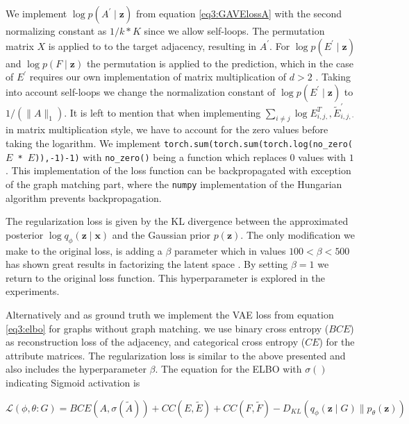 We implement $\log p\left(A^{\prime} \mid \mathbf{z}\right)$ from equation \ref{eq3:GAVElossA} with the second normalizing constant as $1 / k*K$ since we allow self-loops. The permutation matrix $X$ is applied to to the target adjacency, resulting in $A^{\prime}$. For $\log p\left(E^{\prime} \mid \mathbf{z}\right)$ and $\log p\left(F \mid \mathbf{z}\right)$ the permutation is applied to the prediction, which in the case of $E^\prime$ requires our own implementation of matrix multiplication of $d>2$ . Taking into account self-loops we change the normalization constant of $\log p\left(E^{\prime} \mid \mathbf{z}\right)$ to $1 /\left(\|A\|_{1}\right)$. It is left to mention that when implementing $\sum_{i \neq j} \log E_{i, j,}^{T}, \widetilde{E}_{i, j, \cdot}^{\prime}$ in matrix multiplication style, we have to account for the zero values before taking the logarithm. We implement \texttt{torch.sum(torch.sum(torch.log(no\_zero($E$ * $\hat{E}$)),-1)-1)} with \texttt{no\_zero()} being a function which replaces $0$ values with $1$. This implementation of the loss function can be backpropagated with exception of the graph matching part, where the \texttt{numpy} implementation of the Hungarian algorithm prevents backpropagation.

The regularization loss is given by the KL divergence between the approximated posterior $\log q_{\phi}\left(\mathbf{z} \mid \mathbf{x}\right)$ and the Gaussian prior $p(\mathbf{z})$. The only modification we make to the original loss, is adding a $\beta$ parameter which in values $100<\beta <500$ has shown great results in factorizing the latent space \cite{higgins_beta-vae_2016}. By setting $\beta=1$ we return to the original loss function. This hyperparameter is explored in the experiments.


Alternatively and as ground truth we implement the VAE loss from equation \ref{eq3:elbo} for graphs without graph matching. we use binary cross entropy ($BCE$) as reconstruction loss of the adjacency,  and categorical cross entropy ($CE$) for the attribute matrices. The regularization loss is similar to the above presented and also includes the hyperparameter $\beta$. The equation for the ELBO with $\sigma()$ indicating Sigmoid activation is

\begin{equation}
    \mathcal{L}(\phi,\theta:G) = BCE(A,\sigma(\tilde{A})) + CC(E,\tilde{E}) + CC(F,\tilde{F}) - D_{K L}\left(q_{{\phi}}\left(\mathbf{z} \mid G\right) \| p_{{\theta}}(\mathbf{z})\right)
    \label{eg4:normalELBO}
\end{equation}

